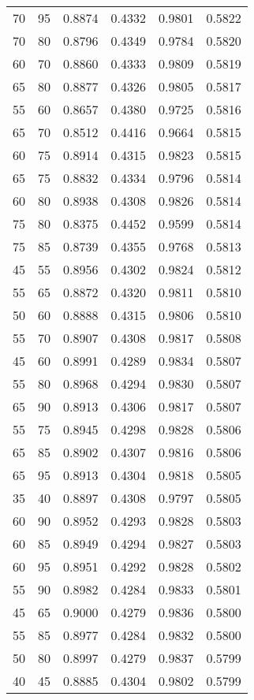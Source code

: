\begin{center}
\begin{longtable}{|l|l|l|l|l|l|}
70 & 95 & 0.8874 & 0.4332 & 0.9801 & 0.5822 \\
70 & 80 & 0.8796 & 0.4349 & 0.9784 & 0.5820 \\
60 & 70 & 0.8860 & 0.4333 & 0.9809 & 0.5819 \\
65 & 80 & 0.8877 & 0.4326 & 0.9805 & 0.5817 \\
55 & 60 & 0.8657 & 0.4380 & 0.9725 & 0.5816 \\
65 & 70 & 0.8512 & 0.4416 & 0.9664 & 0.5815 \\
60 & 75 & 0.8914 & 0.4315 & 0.9823 & 0.5815 \\
65 & 75 & 0.8832 & 0.4334 & 0.9796 & 0.5814 \\
60 & 80 & 0.8938 & 0.4308 & 0.9826 & 0.5814 \\
75 & 80 & 0.8375 & 0.4452 & 0.9599 & 0.5814 \\
75 & 85 & 0.8739 & 0.4355 & 0.9768 & 0.5813 \\
45 & 55 & 0.8956 & 0.4302 & 0.9824 & 0.5812 \\
55 & 65 & 0.8872 & 0.4320 & 0.9811 & 0.5810 \\
50 & 60 & 0.8888 & 0.4315 & 0.9806 & 0.5810 \\
55 & 70 & 0.8907 & 0.4308 & 0.9817 & 0.5808 \\
45 & 60 & 0.8991 & 0.4289 & 0.9834 & 0.5807 \\
55 & 80 & 0.8968 & 0.4294 & 0.9830 & 0.5807 \\
65 & 90 & 0.8913 & 0.4306 & 0.9817 & 0.5807 \\
55 & 75 & 0.8945 & 0.4298 & 0.9828 & 0.5806 \\
65 & 85 & 0.8902 & 0.4307 & 0.9816 & 0.5806 \\
65 & 95 & 0.8913 & 0.4304 & 0.9818 & 0.5805 \\
35 & 40 & 0.8897 & 0.4308 & 0.9797 & 0.5805 \\
60 & 90 & 0.8952 & 0.4293 & 0.9828 & 0.5803 \\
60 & 85 & 0.8949 & 0.4294 & 0.9827 & 0.5803 \\
60 & 95 & 0.8951 & 0.4292 & 0.9828 & 0.5802 \\
55 & 90 & 0.8982 & 0.4284 & 0.9833 & 0.5801 \\
45 & 65 & 0.9000 & 0.4279 & 0.9836 & 0.5800 \\
55 & 85 & 0.8977 & 0.4284 & 0.9832 & 0.5800 \\
50 & 80 & 0.8997 & 0.4279 & 0.9837 & 0.5799 \\
40 & 45 & 0.8885 & 0.4304 & 0.9802 & 0.5799 \\

\end{longtable}
\end{center}
